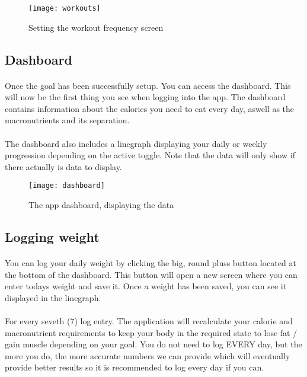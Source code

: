 \documentclass{article}
\begin{document}
    \hfill \break
    \hfill \break
        
    \begin{figure}[h!]
        \texttt{[image: workouts]}
        \centering
        \caption{Setting the workout frequency screen}
    \end{figure}
    \newpage

\subsection{Dashboard}
\paragraph{}
    Once the goal has been successfully setup. You can access the dashboard. This will now be the first thing you see when logging into the app.
    The dashboard contains information about the calories you need to eat every day, aswell as the macronutrients and its separation.

\paragraph{}
    The dashboard also includes a linegraph displaying your daily or weekly progression depending on the active toggle. Note that the data will
    only show if there actually is data to display.
  
    \hfill \break
    \hfill \break
        
    \begin{figure}[h!]
        \texttt{[image: dashboard]}
        \centering
        \caption{The app dashboard, displaying the data}
    \end{figure}
    \newpage

\subsection{Logging weight}
\paragraph{}
    You can log your daily weight by clicking the big, round pluss button located at the bottom of the dashboard. This button will open a new screen
    where you can enter todays weight and save it. Once a weight has been saved, you can see it displayed in the linegraph. 
    
\paragraph{}
    For every seveth (7) log entry.
    The application will recalculate your calorie and macronutrient requirements to keep your body in the required state to lose fat / gain muscle depending
    on your goal. You do not need to log EVERY day, but the more you do, the more accurate numbers we can provide which will eventually provide better results
    so it is recommended to log every day if you can.
      
\end{document}
